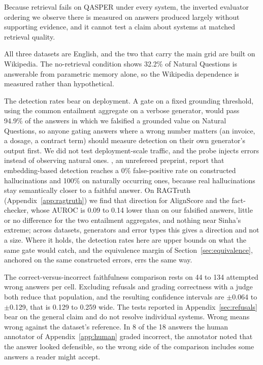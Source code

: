 \documentclass[11pt]{article}
\newcommand{\movedref}{Appendix}            %
\newcommand{\movedref}{Section}
\begin{document}
Because retrieval fails on QASPER under every system, the inverted evaluator ordering we observe there is measured on answers produced largely without supporting evidence, and it cannot test a claim about systems at matched retrieval quality.

All three datasets are English, and the two that carry the main grid are built on Wikipedia. The no-retrieval condition shows 32.2\% of Natural Questions is answerable from parametric memory alone, so the Wikipedia dependence is measured rather than hypothetical.

The detection rates bear on deployment. A gate on a fixed grounding threshold, using the common entailment aggregate on a verbose generator, would pass 94.9\% of the answers in which we falsified a grounded value on Natural Questions, so anyone gating answers where a wrong number matters (an invoice, a dosage, a contract term) should measure detection on their own generator's output first. We did not test deployment-scale traffic, and the probe injects errors instead of observing natural ones. \citet{sinha-2025}, an unrefereed preprint, report that embedding-based detection reaches a 0\% false-positive rate on constructed hallucinations and 100\% on naturally occurring ones, because real hallucinations stay semantically closer to a faithful answer. On RAGTruth (Appendix~\ref{app:ragtruth}) we find that direction for AlignScore and the fact-checker, whose AUROC is 0.09 to 0.14 lower than on our falsified answers, little or no difference for the two entailment aggregates, and nothing near Sinha's extreme; across datasets, generators and error types this gives a direction and not a size. Where it holds, the detection rates here are upper bounds on what the same gate would catch, and the equivalence margin of Section~\ref{sec:equivalence}, anchored on the same constructed errors, errs the same way.

The correct-versus-incorrect faithfulness comparison rests on 44 to 134 attempted wrong answers per cell. Excluding refusals and grading correctness with a judge both reduce that population, and the resulting confidence intervals are $\pm$0.064 to $\pm$0.129, that is 0.129 to 0.259 wide. The tests reported in \movedref~\ref{sec:refusals} bear on the general claim and do not resolve individual systems. Wrong means wrong against the dataset's reference. In 8 of the 18 answers the human annotator of Appendix~\ref{app:human} graded incorrect, the annotator noted that the answer looked defensible, so the wrong side of the comparison includes some answers a reader might accept.
\end{document}
